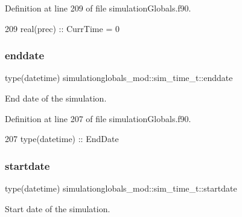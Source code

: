 Definition at line 209 of file simulation\+Globals.\+f90.


\begin{DoxyCode}
209         \textcolor{keywordtype}{real(prec)}      :: CurrTime = 0
\end{DoxyCode}
\mbox{\label{structsimulationglobals__mod_1_1sim__time__t_aaaf97413c1d145b1eb979ad2abbdd90e}} 
\subsubsection{\texorpdfstring{enddate}{enddate}}
{\footnotesize\ttfamily type(datetime) simulationglobals\+\_\+mod\+::sim\+\_\+time\+\_\+t\+::enddate\hspace{0.3cm}{\ttfamily [private]}}



End date of the simulation. 



Definition at line 207 of file simulation\+Globals.\+f90.


\begin{DoxyCode}
207         \textcolor{keywordtype}{type}(datetime)  :: EndDate
\end{DoxyCode}
\mbox{\label{structsimulationglobals__mod_1_1sim__time__t_a4d412156c617a836839456e857e249de}} 
\subsubsection{\texorpdfstring{startdate}{startdate}}
{\footnotesize\ttfamily type(datetime) simulationglobals\+\_\+mod\+::sim\+\_\+time\+\_\+t\+::startdate\hspace{0.3cm}{\ttfamily [private]}}



Start date of the simulation. 



